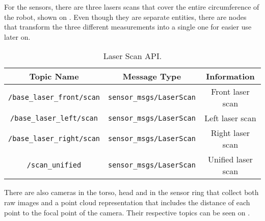 For the sensors, there are three lasers scans that cover the entire circumference of the robot, shown on . Even though they are separate entities, there are nodes that transform the three different measurements into a single one for easier use later on.

\begin{table}[!ht]
\caption{Laser Scan API.} \label{tab:laserapi}
\centering
\renewcommand*{\arraystretch}{1.1}
\begin{tabular}{c|c|c}
Topic Name & Message Type & Information \\
\hline
\texttt{/base\_laser\_front/scan} & \texttt{sensor\_msgs/LaserScan} & Front laser scan \\ \hline
\texttt{/base\_laser\_left/scan} & \texttt{sensor\_msgs/LaserScan} & Left laser scan \\ \hline
\texttt{/base\_laser\_right/scan} & \texttt{sensor\_msgs/LaserScan} & Right laser scan \\ \hline
\texttt{/scan\_unified} & \texttt{sensor\_msgs/LaserScan} & Unified laser scan \\ \hline
\end{tabular}
\end{table}

There are also cameras in the torso, head and in the sensor ring that collect both raw images and a point cloud representation that includes the distance of each point to the focal point of the camera. Their respective topics can be seen on .

